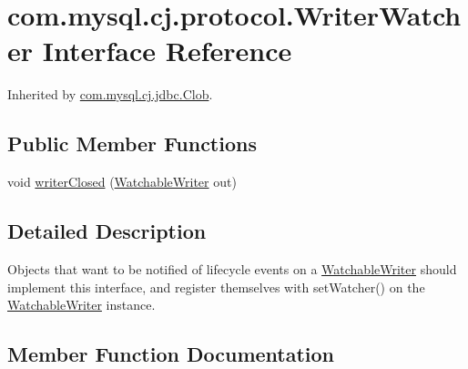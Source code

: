 \hypertarget{interfacecom_1_1mysql_1_1cj_1_1protocol_1_1_writer_watcher}{}\section{com.\+mysql.\+cj.\+protocol.\+Writer\+Watcher Interface Reference}
\label{interfacecom_1_1mysql_1_1cj_1_1protocol_1_1_writer_watcher}


Inherited by \mbox{\hyperlink{classcom_1_1mysql_1_1cj_1_1jdbc_1_1_clob}{com.\+mysql.\+cj.\+jdbc.\+Clob}}.

\subsection*{Public Member Functions}
\begin{DoxyCompactItemize}
\item 
void \mbox{\hyperlink{interfacecom_1_1mysql_1_1cj_1_1protocol_1_1_writer_watcher_a12b4673c6a8478886d9d53dae4afe032}{writer\+Closed}} (\mbox{\hyperlink{classcom_1_1mysql_1_1cj_1_1protocol_1_1_watchable_writer}{Watchable\+Writer}} out)
\end{DoxyCompactItemize}


\subsection{Detailed Description}
Objects that want to be notified of lifecycle events on a \mbox{\hyperlink{classcom_1_1mysql_1_1cj_1_1protocol_1_1_watchable_writer}{Watchable\+Writer}} should implement this interface, and register themselves with set\+Watcher() on the \mbox{\hyperlink{classcom_1_1mysql_1_1cj_1_1protocol_1_1_watchable_writer}{Watchable\+Writer}} instance. 

\subsection{Member Function Documentation}
\mbox{\label{interfacecom_1_1mysql_1_1cj_1_1protocol_1_1_writer_watcher_a12b4673c6a8478886d9d53dae4afe032}} 
